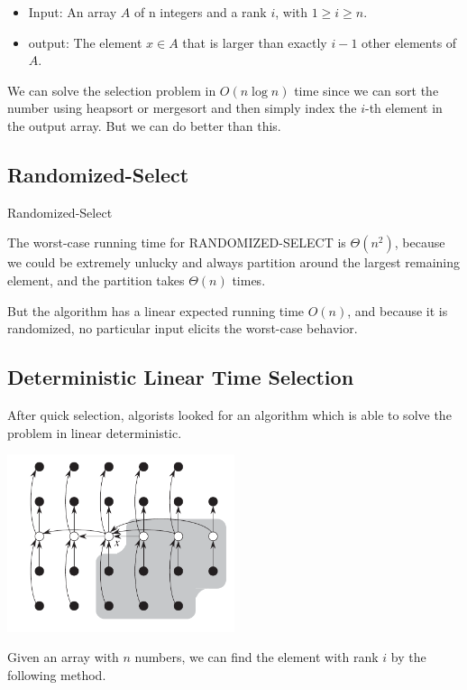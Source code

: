 \begin{itemize}
	\item Input: An array $A$ of n integers and a rank $i$, with $1\ge i\ge n$.
	\item output: The element $x\in A$ that is larger than exactly $i-1$ other
	elements of $A$.
\end{itemize}
We can solve the selection problem in $O(n\log n)$ time since we
can sort the number using heapsort or mergesort and then simply index
the $i$-th element in the output array. But we can do better than this.

\subsection{Randomized-Select}
\begin{algorithm}[H]
	
	\caption{Randomized-Select}
\end{algorithm}
The worst-case running time for RANDOMIZED-SELECT is $\Theta(n^2)$, because we 
could be extremely unlucky and always partition around the largest remaining 
element, and the partition takes $\Theta(n)$ times.

But the algorithm has a linear expected running time $O(n)$, and because it is 
randomized, no particular input elicits the worst-case behavior.

\subsection{Deterministic Linear Time Selection}
After quick selection, algorists looked for an algorithm which is able to solve 
the problem in linear deterministic.

\centerline{\includegraphics[width=0.5\textwidth]{deterministic-select.png}}
Given an array with $n$ numbers, we can find the element with rank $i$ by the following method.
	
